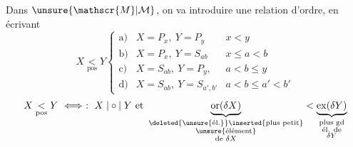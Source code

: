 Dans $\unsure{\mathscr{M}|\mathcal{M}}$, on va introduire une relation d'ordre, en écrivant
\[
X\underset{\mathrm{pos}}{<}Y
\left\{
\begin{array}{lll}
\text{a)}&X=P_x,\ Y=P_y&x<y\\
\text{b)}&X=P_x,\ Y=S_{ab}&x\leq a<b\\
\text{c)}&X=S_{ab},\ Y=P_y,&a<b\leq y\\
\text{d)}&X=S_{ab},\ Y=S_{a',b'}&a<b\leq a'<b'
\end{array}\right.
\]
\[
X\underset{\mathrm{pos}}{<}Y\ \Longleftrightarrow\ :\ X\mathrel{|\circ|}Y\text{ et }
\underbrace{\operatorname{or}(\delta X)}_{\substack{\deleted{\text{\unsure{él.}}}\inserted{\text{plus petit}}\\\text{\unsure{élément}}\\\text{de }\delta X}}
<\underbrace{\operatorname{ex}(\delta Y)}_{\substack{\text{plus gd}\\\text{él. de}\\\delta Y}}
\]
